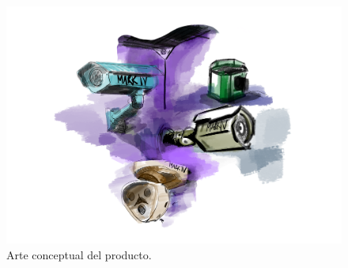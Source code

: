 \begin{figure}[H]
\centering
\includegraphics[width=0.70\linewidth]{media/concept_art.png}
\caption{\label{fig:concept_art}Arte conceptual del producto.}
\end{figure}